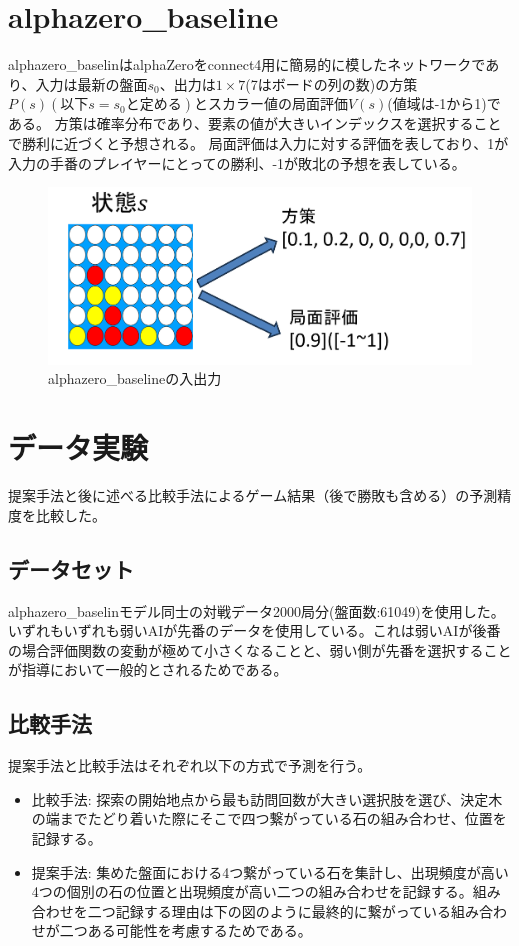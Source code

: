 \section{alphazero\_baseline\cite{baseline}}
alphazero\_baselinはalphaZeroをconnect4用に簡易的に模したネットワークであり、入力は最新の盤面$s_0$、出力は$1\times7$(7はボードの列の数)の方策$P(s)(以下s=s_0と定める)$とスカラー値の局面評価$V(s)$(値域は-1から1)である。
方策は確率分布であり、要素の値が大きいインデックスを選択することで勝利に近づくと予想される。
局面評価は入力に対する評価を表しており、1が入力の手番のプレイヤーにとっての勝利、-1が敗北の予想を表している。
\begin{figure}[t]
	\centering
	\includegraphics[width=\linewidth]{./figure/baseline.png}
	\caption{alphazero\_baselineの入出力}
	\label{fig:baseline}
\end{figure}

\section{データ実験}
\label{chap:evaluation}
提案手法と後に述べる比較手法によるゲーム結果（後で勝敗も含める）の予測精度を比較した。
\subsection{データセット}
alphazero\_baselinモデル同士の対戦データ2000局分(盤面数:61049)を使用した。いずれもいずれも弱いAIが先番のデータを使用している。これは弱いAIが後番の場合評価関数の変動が極めて小さくなることと、弱い側が先番を選択することが指導において一般的とされるためである。

\subsection{比較手法}
提案手法と比較手法はそれぞれ以下の方式で予測を行う。

\begin{itemize}
	\item 比較手法: 探索の開始地点から最も訪問回数が大きい選択肢を選び、決定木の端までたどり着いた際にそこで四つ繋がっている石の組み合わせ、位置を記録する。
	\item 提案手法: 集めた盤面における4つ繋がっている石を集計し、出現頻度が高い4つの個別の石の位置と出現頻度が高い二つの組み合わせを記録する。組み合わせを二つ記録する理由は下の図のように最終的に繋がっている組み合わせが二つある可能性を考慮するためである。
\end{itemize}

